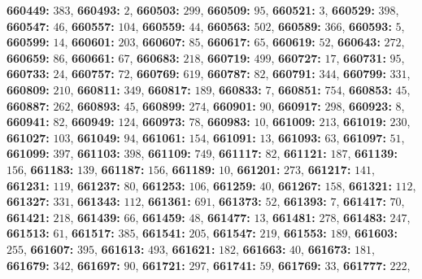 \textsf{\bfseries 660449:} $383$, \textsf{\bfseries 660493:} $2$, \textsf{\bfseries 660503:} $299$, \textsf{\bfseries 660509:} $95$, \textsf{\bfseries 660521:} $3$, \textsf{\bfseries 660529:} $398$, \textsf{\bfseries 660547:} $46$, \textsf{\bfseries 660557:} $104$, \textsf{\bfseries 660559:} $44$, \textsf{\bfseries 660563:} $502$, \textsf{\bfseries 660589:} $366$, \textsf{\bfseries 660593:} $5$, \textsf{\bfseries 660599:} $14$, \textsf{\bfseries 660601:} $203$, \textsf{\bfseries 660607:} $85$, \textsf{\bfseries 660617:} $65$, \textsf{\bfseries 660619:} $52$, \textsf{\bfseries 660643:} $272$, \textsf{\bfseries 660659:} $86$, \textsf{\bfseries 660661:} $67$, \textsf{\bfseries 660683:} $218$, \textsf{\bfseries 660719:} $499$, \textsf{\bfseries 660727:} $17$, \textsf{\bfseries 660731:} $95$, \textsf{\bfseries 660733:} $24$, \textsf{\bfseries 660757:} $72$, \textsf{\bfseries 660769:} $619$, \textsf{\bfseries 660787:} $82$, \textsf{\bfseries 660791:} $344$, \textsf{\bfseries 660799:} $331$, \textsf{\bfseries 660809:} $210$, \textsf{\bfseries 660811:} $349$, \textsf{\bfseries 660817:} $189$, \textsf{\bfseries 660833:} $7$, \textsf{\bfseries 660851:} $754$, \textsf{\bfseries 660853:} $45$, \textsf{\bfseries 660887:} $262$, \textsf{\bfseries 660893:} $45$, \textsf{\bfseries 660899:} $274$, \textsf{\bfseries 660901:} $90$, \textsf{\bfseries 660917:} $298$, \textsf{\bfseries 660923:} $8$, \textsf{\bfseries 660941:} $82$, \textsf{\bfseries 660949:} $124$, \textsf{\bfseries 660973:} $78$, \textsf{\bfseries 660983:} $10$, \textsf{\bfseries 661009:} $213$, \textsf{\bfseries 661019:} $230$, \textsf{\bfseries 661027:} $103$, \textsf{\bfseries 661049:} $94$, \textsf{\bfseries 661061:} $154$, \textsf{\bfseries 661091:} $13$, \textsf{\bfseries 661093:} $63$, \textsf{\bfseries 661097:} $51$, \textsf{\bfseries 661099:} $397$, \textsf{\bfseries 661103:} $398$, \textsf{\bfseries 661109:} $749$, \textsf{\bfseries 661117:} $82$, \textsf{\bfseries 661121:} $187$, \textsf{\bfseries 661139:} $156$, \textsf{\bfseries 661183:} $139$, \textsf{\bfseries 661187:} $156$, \textsf{\bfseries 661189:} $10$, \textsf{\bfseries 661201:} $273$, \textsf{\bfseries 661217:} $141$, \textsf{\bfseries 661231:} $119$, \textsf{\bfseries 661237:} $80$, \textsf{\bfseries 661253:} $106$, \textsf{\bfseries 661259:} $40$, \textsf{\bfseries 661267:} $158$, \textsf{\bfseries 661321:} $112$, \textsf{\bfseries 661327:} $331$, \textsf{\bfseries 661343:} $112$, \textsf{\bfseries 661361:} $691$, \textsf{\bfseries 661373:} $52$, \textsf{\bfseries 661393:} $7$, \textsf{\bfseries 661417:} $70$, \textsf{\bfseries 661421:} $218$, \textsf{\bfseries 661439:} $66$, \textsf{\bfseries 661459:} $48$, \textsf{\bfseries 661477:} $13$, \textsf{\bfseries 661481:} $278$, \textsf{\bfseries 661483:} $247$, \textsf{\bfseries 661513:} $61$, \textsf{\bfseries 661517:} $385$, \textsf{\bfseries 661541:} $205$, \textsf{\bfseries 661547:} $219$, \textsf{\bfseries 661553:} $189$, \textsf{\bfseries 661603:} $255$, \textsf{\bfseries 661607:} $395$, \textsf{\bfseries 661613:} $493$, \textsf{\bfseries 661621:} $182$, \textsf{\bfseries 661663:} $40$, \textsf{\bfseries 661673:} $181$, \textsf{\bfseries 661679:} $342$, \textsf{\bfseries 661697:} $90$, \textsf{\bfseries 661721:} $297$, \textsf{\bfseries 661741:} $59$, \textsf{\bfseries 661769:} $33$, \textsf{\bfseries 661777:} $222$, 
